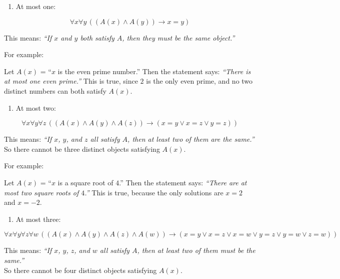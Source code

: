 \begin{enumerate}
  \begin{enumerate}
  \def\labelenumii{\alph{enumii})}
  \tightlist
  \item
    At most one:
  \end{enumerate}

  \[
   \forall x \forall y \, ((A(x) \land A(y)) \rightarrow x = y)
   \]

  This means: \emph{``If \(x\) and \(y\) both satisfy \(A\), then they
  must be the same object.''}

  For example:

  Let \(A(x)\) = ``\(x\) is the even prime number.'' Then the statement
  says: \emph{``There is at most one even prime.''} This is true, since
  \(2\) is the only even prime, and no two distinct numbers can both
  satisfy \(A(x)\).

  \begin{enumerate}
  \def\labelenumii{\alph{enumii})}
  \setcounter{enumii}{1}
  \tightlist
  \item
    At most two:
  \end{enumerate}

  \[
   \forall x \forall y \forall z \, ((A(x) \land A(y) \land A(z)) \rightarrow (x = y \lor x = z \lor y = z))
   \]

  This means: \emph{``If \(x\), \(y\), and \(z\) all satisfy \(A\), then
  at least two of them are the same.''} So there cannot be three
  distinct objects satisfying \(A(x)\).

  For example:

  Let \(A(x)\) = ``\(x\) is a square root of \(4\).'' Then the statement
  says: \emph{``There are at most two square roots of \(4\).''} This is
  true, because the only solutions are \(x = 2\) and \(x = -2\).

  \begin{enumerate}
  \def\labelenumii{\alph{enumii})}
  \setcounter{enumii}{2}
  \tightlist
  \item
    At most three:
  \end{enumerate}

  \[
   \forall x \forall y \forall z \forall w \, ((A(x) \land A(y) \land A(z) \land A(w)) \rightarrow (x = y \lor x = z \lor x = w \lor y = z \lor y = w \lor z = w))
   \]

  This means: \emph{``If \(x\), \(y\), \(z\), and \(w\) all satisfy
  \(A\), then at least two of them must be the same.''}\\
  So there cannot be four distinct objects satisfying \(A(x)\).


\end{enumerate}
